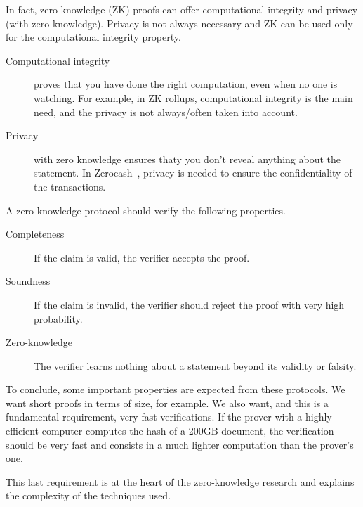 In fact, zero-knowledge (ZK) proofs can offer computational integrity and privacy (with zero knowledge). Privacy is not always necessary and ZK can be used only for the computational integrity property. 
\begin{description}
    \item[Computational integrity] proves that you have done the right computation, even when no one is watching. For example, in ZK rollups,  computational integrity is the main need, and the privacy is not always/often taken into account.
    \item[Privacy] with zero knowledge ensures thaty you don't reveal anything about the statement. In Zerocash~\cite{sasson2014zerocash}, privacy is needed to ensure the confidentiality of the transactions.
\end{description}

A zero-knowledge protocol should verify the following properties.
\begin{description}
    \item[Completeness] If the claim is valid, the verifier accepts the proof.
\item[Soundness] If the claim is invalid, the verifier should reject the proof with very high probability.

\item[Zero-knowledge] The verifier learns nothing about a statement beyond its validity or falsity.
\end{description}

To conclude, some important properties are expected from these protocols. We want  short proofs in terms of size, for example. We also want, and this is a fundamental requirement, very fast verifications. If the prover with a highly efficient computer computes the hash of a 200GB document, the verification should be very fast and consists in a much lighter computation than the prover's one.

This last requirement is at the heart of the zero-knowledge research and explains the complexity of the techniques used.